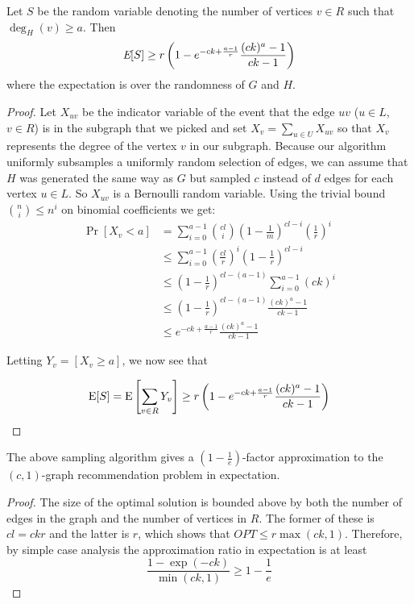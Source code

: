 \begin{thm}\label{original_result}
Let $S$ be the random variable denoting the number of vertices $v \in R$ such that $\deg_{H}(v)\geq a$. Then
\[ \emph{\text{E}}[S] \geq r\left(1-e^{-ck+\frac{a-1}{r}}\frac{(ck)^a-1}{ck-1}\right)  \]
where the expectation is over the randomness of $G$ and $H$.
\end{thm}

\begin{proof}
Let $X_{uv}$ be the indicator variable of the event that the edge $uv$
($u\in L$, $v\in R$) is in the subgraph that we picked
and set $X_{v} = \sum_{u\in U} X_{uv}$ so that $X_{v}$ represents the
degree of the vertex $v$ in our subgraph. Because our algorithm
uniformly subsamples a uniformly random selection of edges, we can
assume that $H$ was generated the same way as $G$ but sampled $c$
instead of $d$ edges for each vertex $u\in L$. So $X_{uv}$ is a
Bernoulli random variable. Using the trivial bound $\binom{n}{i}
\leq n^i$ on binomial coefficients we get:
\begin{align*}
      \Pr[X_v < a]
&=    \sum_{i=0}^{a-1} \binom{cl}{i} \left(1-\frac{1}{m}\right)^{cl-i}\left(\frac{1}{r}\right)^i \\
&\leq \sum_{i=0}^{a-1} \left(\frac{cl}{r}\right)^i\left(1-\frac{1}{r}\right)^{cl-i} \\
&\leq    \left(1-\frac{1}{r}\right)^{cl-(a-1)}\sum_{i=0}^{a-1} (ck)^i \\
&\leq \left(1-\frac{1}{r}\right)^{cl-(a-1)}\frac{(ck)^a-1}{ck-1} \\
&\leq e^{-ck+\frac{a-1}{r}} \frac{(ck)^a-1}{ck-1}
\end{align*}


Letting $Y_v = \left[X_v \geq a\right]$, we now see that

\[ \text{E}[S] = \text{E}\left[\sum_{v\in R} Y_v\right] \geq r\left(1-e^{-ck+\frac{a-1}{r}} \frac{(ck)^a-1}{ck-1}\right) \]
\end{proof}



\begin{thm}
The above sampling algorithm gives a $\left(1-\frac1e\right)$-factor approximation to the $(c,1)$-graph recommendation problem in expectation.
\end{thm}
\begin{proof}
The size of the optimal solution is bounded above by both the number
of edges in the graph and the number of vertices in $R$. The former of
these is $cl=ckr$ and the latter is $r$, which shows that $OPT \leq
r\max(ck,1)$. Therefore, by simple case analysis the approximation ratio
in expectation is at least
\[ \frac{1-\exp(-ck)}{\min(ck,1)} \geq 1-\frac{1}{e} \]
\end{proof}

